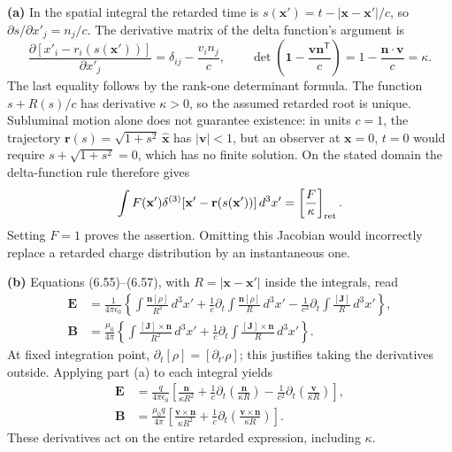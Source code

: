 \textbf{(a)} In the spatial integral the retarded time is
$s(\mathbf x')=t-|\mathbf x-\mathbf x'|/c$, so
$\partial s/\partial x'_j=n_j/c$. The derivative matrix of the delta
function's argument is
\[
\frac{\partial[x'_i-r_i(s(\mathbf x'))]}{\partial x'_j}
=\delta_{ij}-\frac{v_i n_j}{c},\qquad
\det\left(\mathbf1-\frac{\mathbf v\mathbf n^{\mathsf T}}c\right)
=1-\frac{\mathbf n\cdot\mathbf v}c=\kappa.
\]
The last equality follows by the rank-one determinant formula.
The function $s+R(s)/c$ has derivative $\kappa>0$, so the assumed
retarded root is unique. Subluminal motion alone does not guarantee
existence: in units $c=1$, the trajectory
$\mathbf r(s)=\sqrt{1+s^2}\,\hat{\mathbf x}$ has $|\mathbf v|<1$,
but an observer at $\mathbf x=0$, $t=0$ would require
$s+\sqrt{1+s^2}=0$, which has no finite solution.
On the stated domain the delta-function rule therefore gives
\[
\int F(\mathbf x')\delta^{(3)}[\mathbf x'-\mathbf r(s(\mathbf x'))]\,d^3x'
=\left[\frac F\kappa\right]_{\rm ret}.
\]
Setting $F=1$ proves the assertion. Omitting this Jacobian would incorrectly
replace a retarded charge distribution by an instantaneous one.

\textbf{(b)} Equations (6.55)--(6.57), with $R=|\mathbf x-\mathbf x'|$
inside the integrals, read
\begin{align*}
\mathbf E&=\frac1{4\pi\epsilon_0}\left\{
\int\frac{\mathbf n[\rho]}{R^2}\,d^3x'
+\frac1c\partial_t\int\frac{\mathbf n[\rho]}R\,d^3x'
-\frac1{c^2}\partial_t\int\frac{[\mathbf J]}R\,d^3x'\right\},\\
\mathbf B&=\frac{\mu_0}{4\pi}\left\{
\int\frac{[\mathbf J]\times\mathbf n}{R^2}\,d^3x'
+\frac1c\partial_t\int\frac{[\mathbf J]\times\mathbf n}R\,d^3x'\right\}.
\end{align*}
At fixed integration point, $\partial_t[\rho]=[\partial_{t'}\rho]$;
this justifies taking the derivatives outside. Applying part (a) to each
integral yields
\begin{align*}
\boxed{\mathbf E}&=\boxed{\frac q{4\pi\epsilon_0}
\left[\frac{\mathbf n}{\kappa R^2}
+\frac1c\partial_t\left(\frac{\mathbf n}{\kappa R}\right)
-\frac1{c^2}\partial_t\left(\frac{\mathbf v}{\kappa R}\right)\right]},\\
\boxed{\mathbf B}&=\boxed{\frac{\mu_0q}{4\pi}
\left[\frac{\mathbf v\times\mathbf n}{\kappa R^2}
+\frac1c\partial_t\left(\frac{\mathbf v\times\mathbf n}{\kappa R}\right)\right]}.
\end{align*}
These derivatives act on the entire retarded expression, including $\kappa$.

